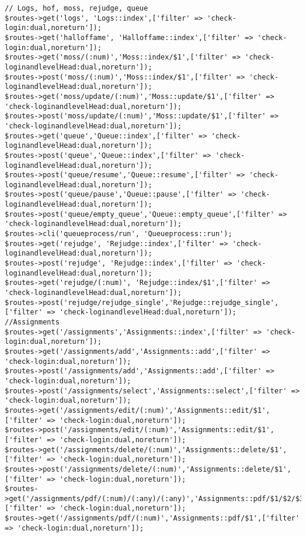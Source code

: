 \begin{lstlisting}[caption=Penambahan \textit{routes} yang digunakan pada aplikasi \textit{SharIF Judge}, label=kode:routesbab4]
// Logs, hof, moss, rejudge, queue
$routes->get('logs', 'Logs::index',['filter' => 'check-login:dual,noreturn']);
$routes->get('halloffame', 'Halloffame::index',['filter' => 'check-login:dual,noreturn']);
$routes->get('moss/(:num)','Moss::index/$1',['filter' => 'check-loginandlevelHead:dual,noreturn']);
$routes->post('moss/(:num)','Moss::index/$1',['filter' => 'check-loginandlevelHead:dual,noreturn']);
$routes->get('moss/update/(:num)','Moss::update/$1',['filter' => 'check-loginandlevelHead:dual,noreturn']);
$routes->post('moss/update/(:num)','Moss::update/$1',['filter' => 'check-loginandlevelHead:dual,noreturn']);
$routes->get('queue','Queue::index',['filter' => 'check-loginandlevelHead:dual,noreturn']);
$routes->post('queue','Queue::index',['filter' => 'check-loginandlevelHead:dual,noreturn']);
$routes->post('queue/resume','Queue::resume',['filter' => 'check-loginandlevelHead:dual,noreturn']);
$routes->post('queue/pause','Queue::pause',['filter' => 'check-loginandlevelHead:dual,noreturn']);
$routes->post('queue/empty_queue','Queue::empty_queue',['filter' => 'check-loginandlevelHead:dual,noreturn']);
$routes->cli('queueprocess/run', 'Queueprocess::run');
$routes->get('rejudge', 'Rejudge::index',['filter' => 'check-loginandlevelHead:dual,noreturn']);
$routes->post('rejudge', 'Rejudge::index',['filter' => 'check-loginandlevelHead:dual,noreturn']);
$routes->get('rejudge/(:num)', 'Rejudge::index/$1',['filter' => 'check-loginandlevelHead:dual,noreturn']);
$routes->post('rejudge/rejudge_single','Rejudge::rejudge_single',['filter' => 'check-loginandlevelHead:dual,noreturn']);
//Assignments
$routes->get('/assignments','Assignments::index',['filter' => 'check-login:dual,noreturn']);
$routes->get('/assignments/add','Assignments::add',['filter' => 'check-login:dual,noreturn']);
$routes->post('/assignments/add','Assignments::add',['filter' => 'check-login:dual,noreturn']);
$routes->post('/assignments/select','Assignments::select',['filter' => 'check-login:dual,noreturn']);
$routes->get('/assignments/edit/(:num)','Assignments::edit/$1',['filter' => 'check-login:dual,noreturn']);
$routes->post('/assignments/edit/(:num)','Assignments::edit/$1',['filter' => 'check-login:dual,noreturn']);
$routes->get('/assignments/delete/(:num)','Assignments::delete/$1',['filter' => 'check-login:dual,noreturn']);
$routes->post('/assignments/delete/(:num)','Assignments::delete/$1',['filter' => 'check-login:dual,noreturn']);
$routes->get('/assignments/pdf/(:num)/(:any)/(:any)','Assignments::pdf/$1/$2/$3',['filter' => 'check-login:dual,noreturn']);
$routes->get('/assignments/pdf/(:num)','Assignments::pdf/$1',['filter' => 'check-login:dual,noreturn']);

\end{lstlisting}

